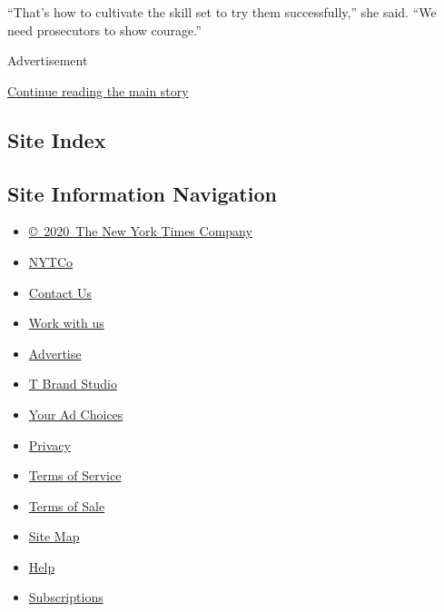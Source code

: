 ``That's how to cultivate the skill set to try them successfully,'' she
said. ``We need prosecutors to show courage.''

Advertisement

\protect\hyperlink{after-bottom}{Continue reading the main story}

\hypertarget{site-index}{%
\subsection{Site Index}\label{site-index}}

\hypertarget{site-information-navigation}{%
\subsection{Site Information
Navigation}\label{site-information-navigation}}

\begin{itemize}
\tightlist
\item
  \href{https://help.nytimes3xbfgragh.onion/hc/en-us/articles/115014792127-Copyright-notice}{©~2020~The
  New York Times Company}
\end{itemize}

\begin{itemize}
\tightlist
\item
  \href{https://www.nytco.com/}{NYTCo}
\item
  \href{https://help.nytimes3xbfgragh.onion/hc/en-us/articles/115015385887-Contact-Us}{Contact
  Us}
\item
  \href{https://www.nytco.com/careers/}{Work with us}
\item
  \href{https://nytmediakit.com/}{Advertise}
\item
  \href{http://www.tbrandstudio.com/}{T Brand Studio}
\item
  \href{https://www.nytimes3xbfgragh.onion/privacy/cookie-policy\#how-do-i-manage-trackers}{Your
  Ad Choices}
\item
  \href{https://www.nytimes3xbfgragh.onion/privacy}{Privacy}
\item
  \href{https://help.nytimes3xbfgragh.onion/hc/en-us/articles/115014893428-Terms-of-service}{Terms
  of Service}
\item
  \href{https://help.nytimes3xbfgragh.onion/hc/en-us/articles/115014893968-Terms-of-sale}{Terms
  of Sale}
\item
  \href{https://spiderbites.nytimes3xbfgragh.onion}{Site Map}
\item
  \href{https://help.nytimes3xbfgragh.onion/hc/en-us}{Help}
\item
  \href{https://www.nytimes3xbfgragh.onion/subscription?campaignId=37WXW}{Subscriptions}
\end{itemize}
